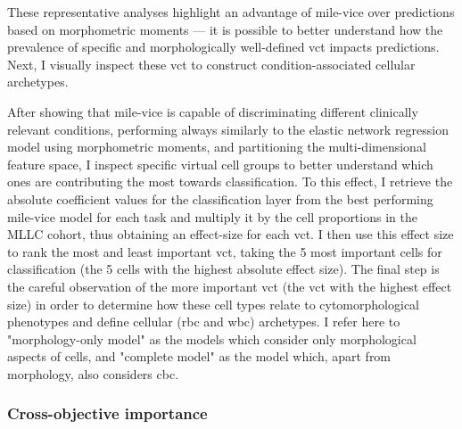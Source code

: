 \begin{figure}[!ht]
    \label{fig:heatmap-slides-vc}
\end{figure}

These representative analyses highlight an advantage of \ac{mile-vice} over predictions based on morphometric moments --- it is possible to better understand how the prevalence of specific and morphologically well-defined \ac{vct} impacts predictions. Next, I visually inspect these \ac{vct} to construct condition-associated cellular archetypes.

After showing that \ac{mile-vice} is capable of discriminating different clinically relevant conditions, performing always similarly to the elastic network regression model using morphometric moments, and partitioning the multi-dimensional feature space, I inspect specific virtual cell groups to better understand which ones are contributing the most towards classification. To this effect, I retrieve the absolute coefficient values for the classification layer from the best performing \ac{mile-vice} model for each task and multiply it by the cell proportions in the MLLC cohort, thus obtaining an effect-size for each \ac{vct}. I then use this effect size to rank the most and least important \ac{vct}, taking the 5 most important cells for classification (the 5 cells with the highest absolute effect size). The final step is the careful observation of the more important \ac{vct} (the \ac{vct} with the highest effect size) in order to determine how these cell types relate to cytomorphological phenotypes and define cellular (\ac{rbc} and \ac{wbc}) archetypes. I refer here to "morphology-only model" as the models which consider only morphological aspects of cells, and "complete model" as the model which, apart from morphology, also considers \ac{cbc}. 

\subsubsection{Cross-objective importance} 

